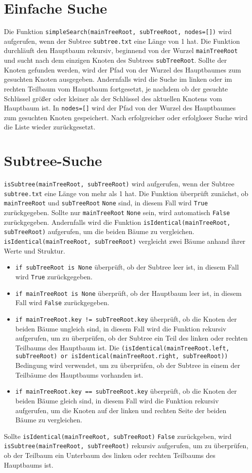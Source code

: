 \documentclass{article}
\begin{document}
\section*{Einfache Suche}
Die Funktion \texttt{simpleSearch(mainTreeRoot, subTreeRoot, nodes=[])} wird aufgerufen, wenn der Subtree \texttt{subtree.txt} eine Länge von 1 hat. Die Funktion durchläuft den Hauptbaum rekursiv, beginnend von der Wurzel
\texttt{mainTreeRoot} und sucht nach dem einzigen Knoten des Subtrees \texttt{subTreeRoot}. Sollte der Knoten gefunden werden, wird der Pfad von der Wurzel des Hauptbaumes zum gesuchten Knoten ausgegeben. Andernfalls wird die Suche im linken oder
im rechten Teilbaum vom Hauptbaum fortgesetzt, je nachdem ob der gesuchte Schlüssel größer oder kleiner als der Schlüssel des aktuellen Knotens vom Hauptbaum ist.
In \texttt{nodes=[]} wird der Pfad von der Wurzel des Hauptbaumes zum gesuchten Knoten gespeichert. Nach erfolgreicher oder erfolgloser Suche wird die Liste wieder zurückgesetzt.

\section*{Subtree-Suche}
\texttt{isSubtree(mainTreeRoot, subTreeRoot)} wird aufgerufen, wenn der Subtree \texttt{subtree.txt} eine Länge von mehr als 1 hat. Die Funktion überprüft zunächst, ob \texttt{mainTreeRoot} und \texttt{subTreeRoot} \texttt{None} sind, in diesem Fall wird \texttt{True} zurückgegeben.
Sollte nur \texttt{mainTreeRoot} \texttt{None} sein, wird automatisch \texttt{False} zurückgegeben. Andernfalls wird die Funktion \texttt{isIdentical(mainTreeRoot, subTreeRoot)} aufgerufen, um die beiden Bäume zu vergleichen.
\texttt{isIdentical(mainTreeRoot, subTreeRoot)} vergleicht zwei Bäume anhand ihrer Werte und Struktur.
\begin{itemize}
    \item \texttt{if subTreeRoot is None} überprüft, ob der Subtree leer ist, in diesem Fall wird \texttt{True} zurückgegeben.
    \item \texttt{if mainTreeRoot is None} überprüft, ob der Hauptbaum leer ist, in diesem Fall wird \texttt{False} zurückgegeben.
    \item \texttt{if mainTreeRoot.key != subTreeRoot.key} überprüft, ob die Knoten der beiden Bäume ungleich sind, in diesem Fall wird die Funktion rekursiv aufgerufen, um zu überprüfen, ob der Subtree ein Teil des linken oder rechten Teilbaums des Hauptbaum ist.
    Die \texttt{(isIdentical(mainTreeRoot.left, subTreeRoot) or isIdentical(mainTreeRoot.right, subTreeRoot))} Bedingung wird verwendet, um zu überprüfen, ob der Subtree in einem der Teilbäume des Hauptbaums vorhanden ist.
    \item \texttt{if mainTreeRoot.key == subTreeRoot.key} überprüft, ob die Knoten der beiden Bäume gleich sind, in diesem Fall wird die Funktion rekursiv aufgerufen, um die Knoten auf der linken und rechten Seite der beiden Bäume zu vergleichen.
\end{itemize}
Sollte \texttt{isIdentical(mainTreeRoot, subTreeRoot)} \texttt{False} zurückgeben, wird \texttt{isSubtree(mainTreeRoot, subTreeRoot)} rekursiv aufgerufen, um zu überprüfen, ob der Teilbaum ein Unterbaum des linken oder rechten Teilbaums des Hauptbaums ist.
\end{document}
